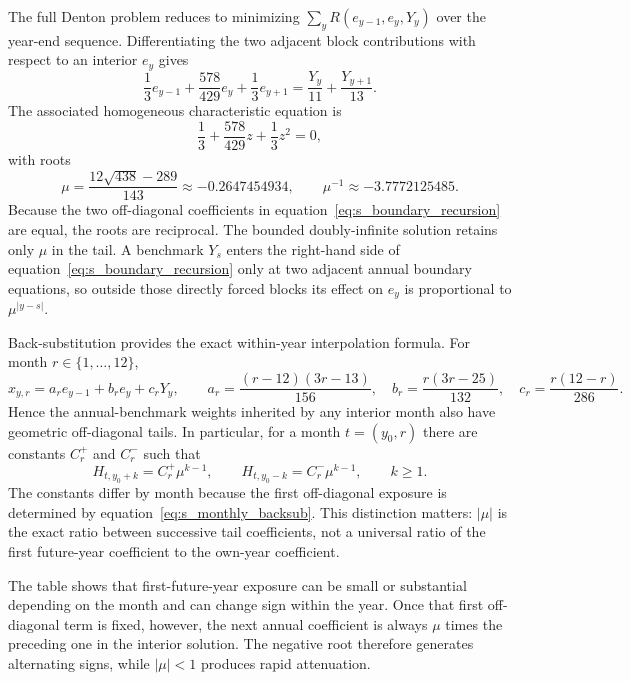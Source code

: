 \documentclass[preprint,12pt,authoryear]{elsarticle}
\begin{document}
The full Denton problem reduces to minimizing $\sum_y R(e_{y-1},e_y,Y_y)$ over the year-end sequence. Differentiating the two adjacent block contributions with respect to an interior $e_y$ gives
\begin{equation}
\frac{1}{3}e_{y-1}+\frac{578}{429}e_y+\frac{1}{3}e_{y+1}
=\frac{Y_y}{11}+\frac{Y_{y+1}}{13}.
\label{eq:s_boundary_recursion}
\end{equation}
The associated homogeneous characteristic equation is
\[
\frac{1}{3}+\frac{578}{429}z+\frac{1}{3}z^2=0,
\]
with roots
\[
\mu=\frac{12\sqrt{438}-289}{143}\approx-0.2647454934,
\qquad
\mu^{-1}\approx-3.7772125485.
\]
Because the two off-diagonal coefficients in equation~\eqref{eq:s_boundary_recursion} are equal, the roots are reciprocal. The bounded doubly-infinite solution retains only $\mu$ in the tail. A benchmark $Y_s$ enters the right-hand side of equation~\eqref{eq:s_boundary_recursion} only at two adjacent annual boundary equations, so outside those directly forced blocks its effect on $e_y$ is proportional to $\mu^{|y-s|}$.

Back-substitution provides the exact within-year interpolation formula. For month $r\in\{1,\ldots,12\}$,
\begin{equation}
x_{y,r}
= a_r e_{y-1}+b_r e_y+c_rY_y,
\qquad
a_r=\frac{(r-12)(3r-13)}{156},\quad
b_r=\frac{r(3r-25)}{132},\quad
c_r=\frac{r(12-r)}{286}.
\label{eq:s_monthly_backsub}
\end{equation}
Hence the annual-benchmark weights inherited by any interior month also have geometric off-diagonal tails. In particular, for a month $t=(y_0,r)$ there are constants $C_r^+$ and $C_r^-$ such that
\[
H_{t,y_0+k}=C_r^+\mu^{k-1},\qquad
H_{t,y_0-k}=C_r^-\mu^{k-1},\qquad k\geq1.
\]
The constants differ by month because the first off-diagonal exposure is determined by equation~\eqref{eq:s_monthly_backsub}. This distinction matters: $|\mu|$ is the exact ratio between successive tail coefficients, not a universal ratio of the first future-year coefficient to the own-year coefficient.



The table shows that first-future-year exposure can be small or substantial depending on the month and can change sign within the year. Once that first off-diagonal term is fixed, however, the next annual coefficient is always $\mu$ times the preceding one in the interior solution. The negative root therefore generates alternating signs, while $|\mu|<1$ produces rapid attenuation.
\end{document}

